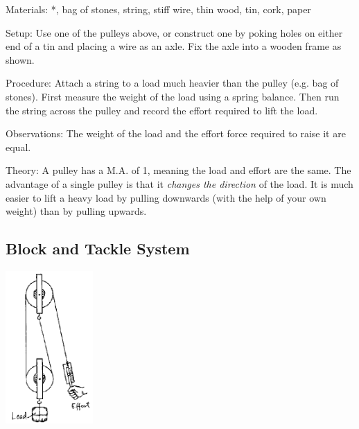 \begin{multicols}{2}
\begin{description*}
\item[Materials:]{*, bag of stones, string, stiff wire, thin wood, tin, cork, paper}
\item[Setup:]{Use one of the pulleys above, or construct one by poking holes on either end of a tin and placing a wire as an axle. Fix the axle into a wooden frame as shown.}
\item[Procedure:]{Attach a string to a load much heavier than the pulley (e.g. bag of stones). First measure the weight of the load using a spring balance. Then run the string across the pulley and record the effort required to lift the load.}
\item[Observations:]{The weight of the load and the effort force required to raise it are equal.}
\item[Theory:]{A pulley has a M.A. of 1, meaning the load and effort are the same. The advantage of a single pulley is that it \emph{changes the direction} of the load. It is much easier to lift a heavy load by pulling downwards (with the help of your own weight) than by pulling upwards.}
\end{description*}

\subsection{Block and Tackle System}

\begin{center}
\includegraphics[width=0.25\textwidth]{./img/source/pulley-system.png}
\end{center}


\end{multicols}

